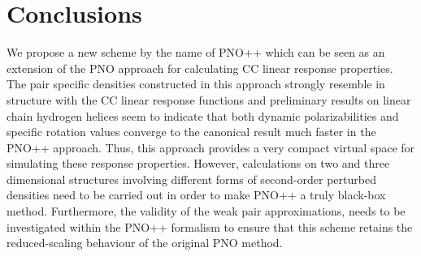 \section{Conclusions}
We propose a new scheme by the name of PNO++ which can be seen as
an extension of the PNO approach for calculating CC
linear response properties. The pair
specific densities constructed in this approach strongly
resemble in structure with the CC linear response functions
and preliminary results on linear chain hydrogen helices
seem to indicate that both dynamic polarizabilities and 
specific rotation values converge to the canonical result 
much faster in the PNO++ approach. Thus, this approach provides 
a very compact virtual space for simulating these response 
properties.
However, calculations on two and three dimensional structures involving different forms of second-order 
perturbed densities need to be carried out in order to make PNO++ a truly black-box method.
Furthermore, the validity of the weak pair approximations, needs to be investigated within the PNO++ formalism
to ensure that this scheme retains the reduced-scaling behaviour of the original PNO method.




